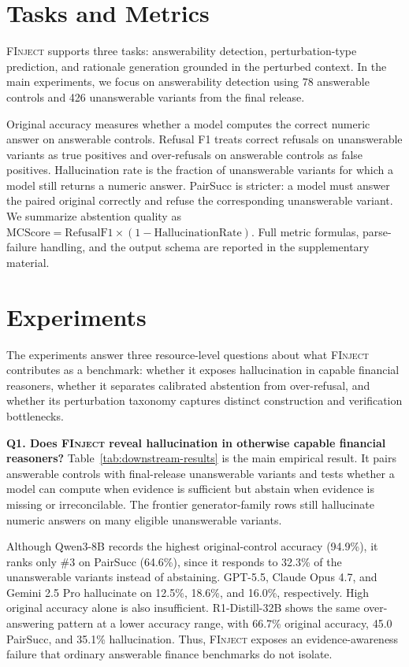 \documentclass[sigconf,review]{acmart}
\newcommand{\bench}{\textsc{FInject}\xspace}
\begin{document}
\section{Tasks and Metrics}

\bench supports three tasks: answerability detection, perturbation-type prediction, and rationale generation grounded in the perturbed context. In the main experiments, we focus on answerability detection using 78 answerable controls and 426 unanswerable variants from the final release.

Original accuracy measures whether a model computes the correct numeric answer on answerable controls. Refusal F1 treats correct refusals on unanswerable variants as true positives and over-refusals on answerable controls as false positives. Hallucination rate is the fraction of unanswerable variants for which a model still returns a numeric answer. PairSucc is stricter: a model must answer the paired original correctly and refuse the corresponding unanswerable variant. We summarize abstention quality as $\mathrm{MCScore} =\mathrm{RefusalF1}\times(1-\mathrm{HallucinationRate})$. Full metric formulas, parse-failure handling, and the output schema are reported in the supplementary material.

\section{Experiments}


The experiments answer three resource-level questions about what \bench contributes as a benchmark: whether it exposes hallucination in capable financial reasoners, whether it separates calibrated abstention from over-refusal, and whether its perturbation taxonomy captures distinct construction and verification bottlenecks.

\textbf{Q1. Does \bench reveal hallucination in otherwise capable financial reasoners?} Table~\ref{tab:downstream-results} is the main empirical result. It pairs answerable controls with final-release unanswerable variants and tests whether a model can compute when evidence is sufficient but abstain when evidence is missing or irreconcilable. The frontier generator-family rows still hallucinate numeric answers on many eligible unanswerable variants.

Although Qwen3-8B records the highest original-control accuracy (94.9\%), it ranks only \#3 on PairSucc (64.6\%), since it responds to 32.3\% of the unanswerable variants instead of abstaining.
GPT-5.5, Claude Opus 4.7, and Gemini 2.5 Pro hallucinate on 12.5\%, 18.6\%, and 16.0\%, respectively. High original accuracy alone is also insufficient. R1-Distill-32B shows the same over-answering pattern at a lower accuracy range, with 66.7\% original accuracy, 45.0 PairSucc, and 35.1\% hallucination. Thus, \bench exposes an evidence-awareness failure that ordinary answerable finance benchmarks do not isolate.
\end{document}
